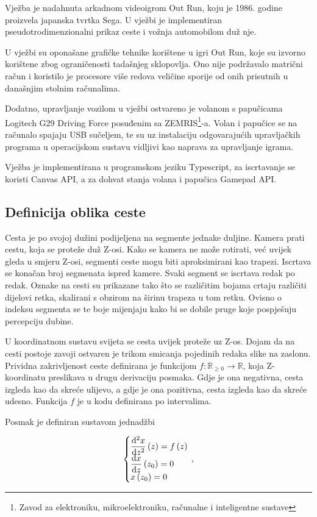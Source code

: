 \documentclass[a4paper]{article}
\begin{document}
Vježba je nadahnuta arkadnom videoigrom Out Run, koju je 1986. godine proizvela japanska tvrtka Sega. U vježbi je implementiran pseudotrodimenzionalni prikaz ceste i vožnja automobilom duž nje.

U vježbi su oponašane grafičke tehnike korištene u igri Out Run, koje su izvorno korištene zbog ograničenosti tadašnjeg sklopovlja. Ono nije podržavalo matrični račun i koristilo je procesore više redova veličine sporije od onih prisutnih u današnjim stolnim računalima.

Dodatno, upravljanje vozilom u vježbi ostvareno je volanom s papučicama Logitech G29 Driving Force posuđenim sa ZEMRIS\footnote{Zavod za elektroniku, mikroelektroniku, računalne i inteligentne sustave}-a. Volan i papučice se na računalo spajaju USB sučeljem, te su uz instalaciju odgovarajućih upravljačkih programa u operacijskom sustavu vidljivi kao naprava za upravljanje igrama.

Vježba je implementirana u programskom jeziku Typescript, za iscrtavanje se koristi Canvas API, a za dohvat stanja volana i papučica Gamepad API.

\subsection{Definicija oblika ceste}
Cesta je po svojoj dužini podijeljena na segmente jednake duljine. Kamera prati cestu, koja se proteže duž Z-osi. Kako se kamera ne može rotirati, već uvijek gleda u smjeru Z-osi, segmenti ceste mogu biti aproksimirani kao trapezi. Iscrtava se konačan broj segmenata ispred kamere. Svaki segment se iscrtava redak po redak. Oznake na cesti su prikazane tako što se različitim bojama crtaju različiti dijelovi retka, skalirani s obzirom na širinu trapeza u tom retku. Ovisno o indeksu segmenta se te boje mijenjaju kako bi se dobile pruge koje pospješuju percepciju dubine.

U koordinatnom sustavu svijeta se cesta uvijek proteže uz Z-os. Dojam da na cesti postoje zavoji ostvaren je trikom smicanja pojedinih redaka slike na zaslonu. Prividna zakrivljenost ceste definirana je funkcijom $ f \colon \mathbb{R}_{\ge 0} \rightarrow \mathbb{R} $, koja Z-koordinatu preslikava u drugu derivaciju posmaka. Gdje je ona negativna, cesta izgleda kao da skreće ulijevo, a gdje je ona pozitivna, cesta izgleda kao da skreće udesno. Funkcija $ f $ je u kodu definirana po intervalima.

Posmak je definiran sustavom jednadžbi

\begin{equation}
	\left\{\begin{array}{@{}l@{}}
		\dfrac{\mathrm{d}^2 x}{\mathrm{d} z^2} \left( z \right) = f\left( z \right)\\
		\dfrac{\mathrm{d}x}{\mathrm{d}z} \left( z_0 \right) = 0\\
		x \left( z_0 \right) = 0
	\end{array}\right.\,,
\end{equation}
\end{document}
